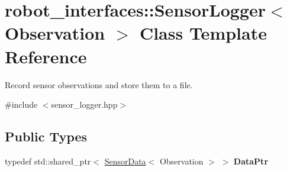 \hypertarget{classrobot__interfaces_1_1SensorLogger}{}\section{robot\+\_\+interfaces\+:\+:Sensor\+Logger$<$ Observation $>$ Class Template Reference}
\label{classrobot__interfaces_1_1SensorLogger}


Record sensor observations and store them to a file.  




{\ttfamily \#include $<$sensor\+\_\+logger.\+hpp$>$}

\subsection*{Public Types}
\begin{DoxyCompactItemize}
\item 
\mbox{\label{classrobot__interfaces_1_1SensorLogger_abfffa764f13c4b260416fbfe7e6a14ea}} 
typedef std\+::shared\+\_\+ptr$<$ \hyperlink{classrobot__interfaces_1_1SensorData}{Sensor\+Data}$<$ Observation $>$ $>$ {\bfseries Data\+Ptr}
\end{DoxyCompactItemize}
